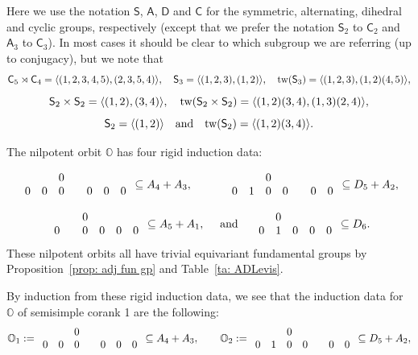 \documentclass[11pt]{amsart}
\renewcommand{\O}{{\mathbb O}}
\newcommand{\Dih}{{\mathsf{D}}}
\newcommand{\Alt}{{\mathsf{A}}}
\newcommand{\Sym}{{\mathsf{S}}}
\newcommand{\Cyc}{{\mathsf{C}}}
\newcommand{\tw}{{{\mbox{\rm tw}}}}
\numberwithin{equation}{section}
\begin{document}
	
	
	Here we use the notation $\Sym$, $\Alt$, $\Dih$ and $\Cyc$ for the symmetric, alternating, dihedral and cyclic groups, respectively (except that we prefer the notation $\Sym_2$ to $\Cyc_2$ and $\Alt_3$ to $\Cyc_3$). In most cases it should be clear to which subgroup we are referring (up to conjugacy), but we note that $$\Cyc_5\rtimes \Cyc_4=\langle(1,2,3,4,5),(2,3,5,4)\rangle,\quad \Sym_3=\langle(1,2,3),(1,2)\rangle, \quad \tw (\Sym_3)=\langle (1,2,3),(1,2)(4,5)\rangle,$$
	$$ \Sym_2\times \Sym_2=\langle (1,2),(3,4)\rangle, \quad \tw(\Sym_2\times\Sym_2)=\langle (1,2)(3,4), (1,3)(2,4)\rangle,$$
	$$ \Sym_2=\langle (1,2)\rangle \quad \mbox{and} \quad \tw(\Sym_2)=\langle (1,2)(3,4)\rangle. $$
	
	The nilpotent orbit $\O$ has four rigid induction data:
	
	$$\begin{array}{c c c c c c c}
		& & 0 & & & &  \\
		0 & 0 & 0 & & 0 & 0 & 0 \\
	\end{array}\subseteq A_4 + A_3,\quad \quad\quad\begin{array}{c c c c c c c}
		& & 0 & & & &  \\
		0 & 1 & 0 & 0 & & 0 & 0 \\
	\end{array}\subseteq D_5 + A_2, $$
	
	$$\begin{array}{c c c c c c}
		& & 0 & & & \\
		0 & & 0 & 0 & 0 & 0\\
	\end{array}\subseteq A_5 + A_1,\quad \,\,\mbox{and}\,\,\quad \begin{array}{c c c c c}
		& 0 & & & \\
		0 & 1 & 0 & 0 & 0 \\
	\end{array}\subseteq D_6. $$ These nilpotent orbits all have trivial equivariant fundamental groups by Proposition~\ref{prop: adj fun gp} and Table~\ref{ta: ADLevis}. 
	
	By induction from these rigid induction data, we see that the induction data for $\O$ of semisimple corank 1 are the following:
	$$\O_1:=\begin{array}{c c c c c c c}
		& & 0 & & & &  \\
		0 & 0 & 0 & & 0 & 0 & 0 \\
	\end{array}\subseteq A_4 + A_3,\quad \quad\O_2:=\begin{array}{c c c c c c c}
		& & 0 & & & &  \\
		0 & 1 & 0 & 0 & & 0 & 0 \\
	\end{array}\subseteq D_5 + A_2, $$
	
\end{document}

